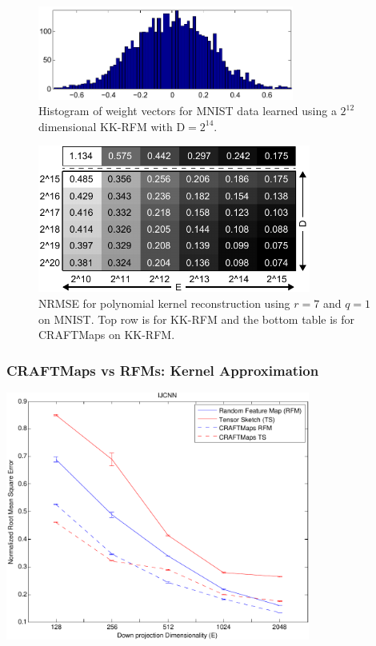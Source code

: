 \documentclass[xcolor=x11names,compress,ignorenonframetext,10pt]{beamer}
\renewcommand{\(}{\begin{columns}}
\renewcommand{\)}{\end{columns}}
\newcommand{\<}[1]{\begin{column}{#1}}
\renewcommand{\>}{\end{column}}
\begin{document}
\begin{frame}
    \begin{figure}
    \begin{center}
      \includegraphics[width=0.75\textwidth]{figures/craftmaps/w2}
    \caption*{Histogram of weight vectors for MNIST data learned using a $2^{12}$ dimensional KK-RFM with $\mathrm{D}=2^{14}.$}
    \end{center}
    \end{figure}
\end{frame}

\begin{frame}
\begin{figure}[h]
    \begin{center}
      \includegraphics[width=0.8\textwidth]{figures/craftmaps/recon_mnist}
        \caption*{\small NRMSE for polynomial kernel reconstruction using $r=7$ and $q=1$ on MNIST. Top row is for KK-RFM and the bottom table is for CRAFTMaps on KK-RFM.}
    \end{center}
    \end{figure}
\end{frame}

\begin{frame}
    \frametitle{CRAFTMaps vs RFMs: Kernel Approximation}
    \begin{center}
      \includegraphics[width=0.75\textwidth]{figures/craftmaps/ijcnn}
    \end{center}
\end{frame}
\end{document}
